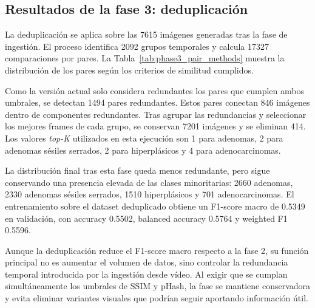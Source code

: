 ﻿\documentclass[10pt,a4paper,twocolumn,twoside]{article}
\begin{document}
\subsection{Resultados de la fase 3: deduplicación}
La deduplicación se aplica sobre las 7615 imágenes generadas tras la fase de ingestión. El proceso identifica 2092 grupos temporales y calcula 17327 comparaciones por pares. La Tabla~\ref{tab:phase3_pair_methods} muestra la distribución de los pares según los criterios de similitud cumplidos.

\begin{table}[t]
\centering
\small
\setlength{\tabcolsep}{4pt}
\caption{Clasificación de pares comparados en la deduplicación}
\label{tab:phase3_pair_methods}
\end{table}

Como la versión actual solo considera redundantes los pares que cumplen ambos umbrales, se detectan 1494 pares redundantes. Estos pares conectan 846 imágenes dentro de componentes redundantes. Tras agrupar las redundancias y seleccionar los mejores frames de cada grupo, se conservan 7201 imágenes y se eliminan 414. Los valores \textit{top-K} utilizados en esta ejecución son 1 para adenomas, 2 para adenomas sésiles serrados, 2 para hiperplásicos y 4 para adenocarcinomas.

La distribución final tras esta fase queda menos redundante, pero sigue conservando una presencia elevada de las clases minoritarias: 2660 adenomas, 2330 adenomas sésiles serrados, 1510 hiperplásicos y 701 adenocarcinomas. El entrenamiento sobre el dataset deduplicado obtiene un F1-score macro de 0.5349 en validación, con accuracy 0.5502, balanced accuracy 0.5764 y weighted F1 0.5596.

Aunque la deduplicación reduce el F1-score macro respecto a la fase 2, su función principal no es aumentar el volumen de datos, sino controlar la redundancia temporal introducida por la ingestión desde vídeo. Al exigir que se cumplan simultáneamente los umbrales de SSIM y pHash, la fase se mantiene conservadora y evita eliminar variantes visuales que podrían seguir aportando información útil.
\end{document}
